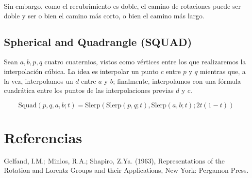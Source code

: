 \documentclass{article}
\theoremstyle{plain}
\theoremstyle{definition}
\theoremstyle{remark}
\begin{document}
Sin embargo, como el recubrimiento es doble, el camino de rotaciones
puede ser doble y ser o bien el camino más corto, o bien el camino más
largo.


\subsection{Spherical and Quadrangle (SQUAD)}

Sean $a,b,p,q$ cuatro cuaternios, vistos como vértices entre los que
realizaremos la interpolación cúbica. La idea es interpolar un punto
$c$ entre $p$ y $q$ mientras que, a la vez, interpolamos un $d$ entre
$a$ y $b$; finalmente, interpolamos con una fórmula cuadrática entre
los puntos de las interpolaciones previas $d$ y $c$.

\[
  \mathrm{Squad}(p,q,a,b;t) =
  \mathrm{Slerp}(\mathrm{Slerp}(p,q;t), \mathrm{Slerp}(a,b;t); 2t(1-t))
\]


\section{Referencias}

\begin{thebibliography}{9}

  Gelfand, I.M.; Minlos, R.A.; Shapiro, Z.Ya. (1963),
  Representations of the Rotation and Lorentz Groups and their Applications,
  New York: Pergamon Press.

\end{thebibliography}
\end{document}
